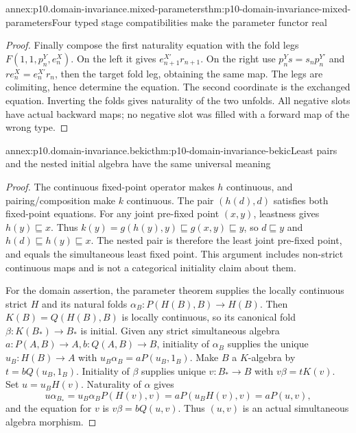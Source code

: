 \begin{annexitem}{annex:p10.domain-invariance.mixed-parameters}{thm:p10-domain-invariance-mixed-parameters}{Four typed stage compatibilities make the parameter functor real}
\begin{proof}
Finally compose the first naturality equation with the fold
legs \(F(1,1,p_n^Y,e_n^X)\). On the left it gives
\(e_{n+1}^{X'}r_{n+1}\). On the right use
\(p_n^Ys=s_np_n^{Y'}\) and \(re_n^X=e_n^{X'}r_n\),
then the target fold leg, obtaining the same map. The legs
are colimiting, hence determine the equation. The second
coordinate is the exchanged equation. Inverting the folds
gives naturality of the two unfolds. All negative slots have
actual backward maps; no negative slot was filled with a
forward map of the wrong type.
\end{proof}
\end{annexitem}

\begin{annexitem}{annex:p10.domain-invariance.bekic}{thm:p10-domain-invariance-bekic}{Least pairs and the nested initial algebra have the same universal meaning}
\begin{proof}
The continuous fixed-point operator makes \(h\) continuous,
and pairing/composition make \(k\) continuous. The pair
\((h(d),d)\) satisfies both fixed-point equations. For any
joint pre-fixed point \((x,y)\), leastness gives \(h(y)\sqsubseteq x\).
Thus \(k(y)=g(h(y),y)\sqsubseteq g(x,y)\sqsubseteq y\),
so \(d\sqsubseteq y\) and
\(h(d)\sqsubseteq h(y)\sqsubseteq x\). The nested pair
is therefore the least joint pre-fixed point, and equals the
simultaneous least fixed point. This argument includes non-strict
continuous maps and is not a categorical initiality claim about them.

For the domain assertion, the parameter theorem supplies the
locally continuous strict \(H\) and its natural folds
\(\alpha_B:P(H(B),B)\to H(B)\).
Then \(K(B)=Q(H(B),B)\) is locally continuous, so its
canonical fold \(\beta:K(B_*)\to B_*\) is initial.
Given any strict simultaneous algebra
\(a:P(A,B)\to A,b:Q(A,B)\to B\), initiality of
\(\alpha_B\) supplies the unique
\(u_B:H(B)\to A\) with
\(u_B\alpha_B=aP(u_B,1_B)\).
Make \(B\) a \(K\)-algebra by
\(t=bQ(u_B,1_B)\). Initiality of \(\beta\) supplies
unique \(v:B_*\to B\) with \(v\beta=tK(v)\).
Set \(u=u_BH(v)\). Naturality of \(\alpha\) gives
\[
 u\alpha_{B_*}
 =u_B\alpha_BP(H(v),v)=aP(u_BH(v),v)=aP(u,v),
\]
and the equation for \(v\) is \(v\beta=bQ(u,v)\).
Thus \((u,v)\) is an actual simultaneous algebra morphism.


\end{proof}
\end{annexitem}
